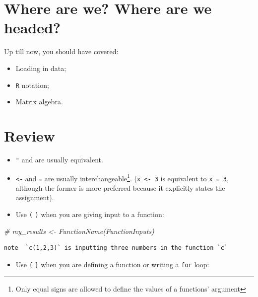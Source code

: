 \documentclass[]{book}
\newenvironment{Shaded}{\begin{snugshade}}{\end{snugshade}}
\newcommand{\CommentTok}[1]{\textcolor[rgb]{0.56,0.35,0.01}{\textit{#1}}}
\providecommand{\tightlist}{%
  \setlength{\itemsep}{0pt}\setlength{\parskip}{0pt}}
\let\rmarkdownfootnote\footnote%
\def\footnote{\protect\rmarkdownfootnote}
\theoremstyle{definition}
\theoremstyle{definition}
\theoremstyle{definition}
\theoremstyle{remark}
\begin{document}
\begin{Shaded}
\begin{Highlighting}[]
\begin{Shaded}
\begin{Highlighting}[]
\begin{Shaded}
\begin{Highlighting}[]
\hypertarget{where-are-we-where-are-we-headed-7}{%
\section*{Where are we? Where are we headed?}\label{where-are-we-where-are-we-headed-7}}

Up till now, you should have covered:

\begin{itemize}
\tightlist
\item
  Loading in data;
\item
  \texttt{R} notation;
\item
  Matrix algebra.
\end{itemize}

\hypertarget{review}{%
\section{Review}\label{review}}

\begin{itemize}
\tightlist
\item
  \texttt{"} and \texttt{\textquotesingle{}} are usually equivalent.
\item
  \texttt{\textless{}-} and \texttt{=} are usually interchangeable\footnote{Only equal signs are allowed to define the values of a functions' argument}. (\texttt{x\ \textless{}-\ 3} is equivalent to \texttt{x\ =\ 3}, although the former is more preferred because it explicitly states the assignment).
\item
  Use \texttt{(} \texttt{)} when you are giving input to a function:
\end{itemize}

\begin{Shaded}
\begin{Highlighting}[]
\CommentTok{# my_results <- FunctionName(FunctionInputs)}
\end{Highlighting}
\end{Shaded}

\begin{verbatim}
note  `c(1,2,3)` is inputting three numbers in the function `c`
\end{verbatim}

\begin{itemize}
\tightlist
\item
  Use \texttt{\{} \texttt{\}} when you are defining a function or writing a \texttt{for} loop:
\end{itemize}


\end{Highlighting}
\end{Shaded}
\end{Highlighting}
\end{Shaded}
\end{Highlighting}
\end{Shaded}
\end{document}

